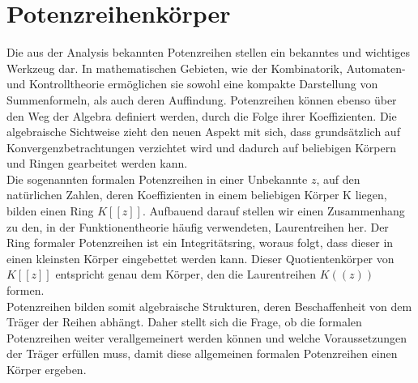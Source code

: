 \chapter{Potenzreihenkörper}\label{chap3}
%
Die aus der Analysis bekannten Potenzreihen stellen ein bekanntes und wichtiges Werkzeug dar. In mathematischen Gebieten, wie der Kombinatorik, Automaten- und Kontrolltheorie ermöglichen sie sowohl eine kompakte Darstellung von Summenformeln, als auch deren Auffindung. Potenzreihen können ebenso über den Weg der Algebra definiert werden, durch die Folge ihrer Koeffizienten. Die algebraische Sichtweise zieht den neuen Aspekt mit sich, dass grundsätzlich auf Konvergenzbetrachtungen verzichtet wird und dadurch auf beliebigen Körpern und Ringen gearbeitet werden kann. \\
Die sogenannten formalen Potenzreihen in einer Unbekannte $z$, auf den natürlichen Zahlen, deren Koeffizienten in einem beliebigen Körper K liegen, bilden einen Ring $K[[z]]$. Aufbauend darauf stellen wir einen Zusammenhang zu den, in der Funktionentheorie häufig verwendeten, Laurentreihen her. Der Ring formaler Potenzreihen ist ein Integritätsring, woraus folgt, dass dieser in einen kleinsten Körper eingebettet werden kann. Dieser Quotientenkörper von $K[[z]]$ entspricht genau dem Körper, den die Laurentreihen $K((z))$ formen. \\
Potenzreihen bilden somit algebraische Strukturen, deren Beschaffenheit von dem Träger der Reihen abhängt. Daher stellt sich die Frage, ob die formalen Potenzreihen weiter verallgemeinert werden können und welche Voraussetzungen der Träger erfüllen muss, damit diese allgemeinen formalen Potenzreihen einen Körper ergeben. %

